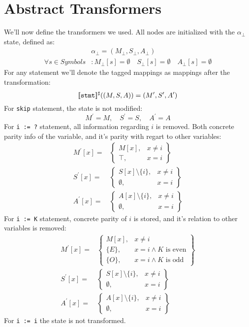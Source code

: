 \section*{Abstract Transformers}
We'll now define the transformers we used. All nodes are initialized with the $\alpha_\bot$ state, defined as:
\begin{align*}
	&\alpha_\bot=(M_\bot, S_\bot, A_\bot) \\
	\forall s \in Symbols&:
	M_\bot[s] =\emptyset  \quad
	S_\bot[s] =\emptyset \quad
	A_\bot[s] =\emptyset
\end{align*}
For any statement we'll denote the tagged mappings as mappings after the transformation:
\begin{equation*}
	[\![\texttt{stmt}]\!]^\sharp((M, S, A)) = (M^\prime,S^\prime,A^\prime)
\end{equation*}
For \texttt{skip} statement, the state is not modified:
\begin{equation*}
	M^\prime = M, \quad S^\prime = S, \quad A^\prime = A
\end{equation*}
For \texttt{i := ?} statement, all information regarding $i$ is removed. Both concrete parity info of the variable, and it's parity with regart to other variables:
\begin{align*}
M^\prime[x] = & \left.
	\begin{cases}
		M[x], & x\ne i \\
		\top, & x = i
	\end{cases}
\right\}\\
S^\prime[x] = & \left.
	\begin{cases}
		S[x] \setminus \{i\}, & x\ne i \\
		\emptyset, & x = i
	\end{cases}
\right\}\\
A^\prime[x] = & \left.
\begin{cases}
	A[x] \setminus \{i\}, & x\ne i \\
	\emptyset, & x = i
\end{cases}
\right\}
\end{align*}
For \texttt{i := K} statement, concrete parity of $i$ is stored, and it's relation to other variables is removed:
\begin{align*}
M^\prime[x] = & \left.
	\begin{cases}
		M[x], & x\ne i \\
		\{E\}, & x = i \wedge K \text{ is even} \\
		\{O\}, & x = i \wedge K \text{ is odd}
	\end{cases}
\right\}\\
S^\prime[x] = & \left.
	\begin{cases}
		S[x] \setminus \{i\}, & x\ne i \\
		\emptyset, & x = i
	\end{cases}
\right\}\\
A^\prime[x] = & \left.
\begin{cases}
	A[x] \setminus \{i\}, & x\ne i \\
	\emptyset, & x = i
\end{cases}
\right\}
\end{align*}
For \texttt{i := i} the state is not transformed.

